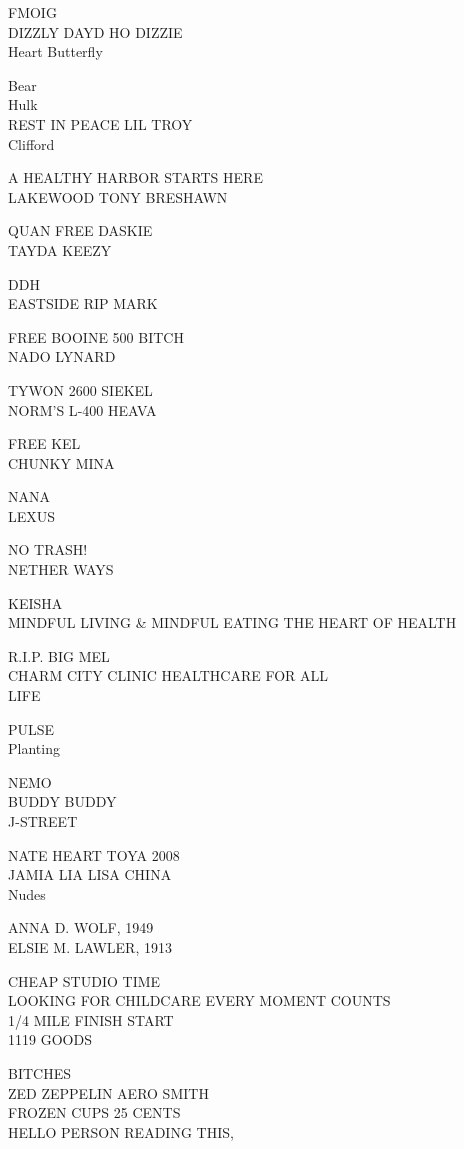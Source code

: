 \documentclass[10pt,letterpaper]{article}
\begin{document}
FMOIG\\
DIZZLY DAYD HO DIZZIE\\
Heart Butterfly

Bear\\
Hulk\\
REST IN PEACE LIL TROY\\
Clifford

A HEALTHY HARBOR STARTS HERE\\
LAKEWOOD TONY BRESHAWN

QUAN FREE DASKIE\\
TAYDA KEEZY

DDH\\
EASTSIDE RIP MARK

FREE BOOINE 500 BITCH\\
NADO LYNARD

TYWON 2600 SIEKEL\\
NORM'S L{-}400 HEAVA

FREE KEL\\
CHUNKY MINA

NANA\\
LEXUS

NO TRASH!\\
NETHER WAYS

KEISHA\\
MINDFUL LIVING \& MINDFUL EATING THE HEART OF HEALTH

R.I.P. BIG MEL\\
CHARM CITY CLINIC HEALTHCARE FOR ALL\\
LIFE

PULSE\\
Planting

NEMO\\
BUDDY BUDDY\\
J{-}STREET

NATE HEART TOYA 2008\\
JAMIA LIA LISA CHINA\\
Nudes

ANNA D. WOLF, 1949\\
ELSIE M. LAWLER, 1913

CHEAP STUDIO TIME\\
LOOKING FOR CHILDCARE EVERY MOMENT COUNTS\\
1/4 MILE FINISH START\\
1119 GOODS

BITCHES\\
ZED ZEPPELIN AERO SMITH\\
FROZEN CUPS 25 CENTS\\
HELLO PERSON READING THIS,
\end{document}
